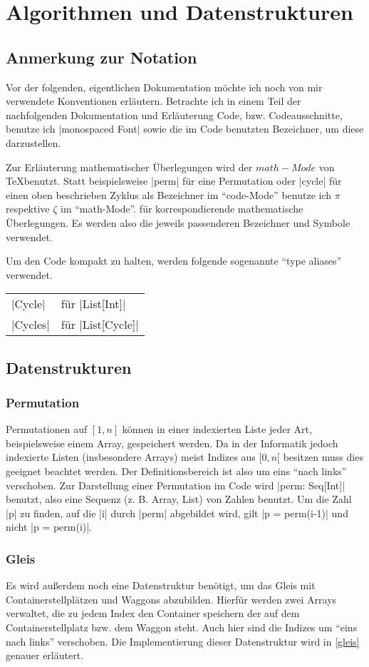 \section{Algorithmen und Datenstrukturen}
\subsection{Anmerkung zur Notation}
Vor der folgenden, eigentlichen Dokumentation möchte ich noch von mir verwendete Konventionen erläutern.
Betrachte ich in einem Teil der nachfolgenden Dokumentation und Erläuterung Code, bzw. Codeausschnitte,
benutze ich |monospaced Font| sowie die im Code benutzten Bezeichner, um diese darzustellen.

Zur Erläuterung mathematischer Überlegungen wird der $math-Mode$ von \TeX benutzt.
Statt beispielsweise |perm| für eine Permutation oder |cycle| für einen oben beschrieben Zyklus als Bezeichner im ``code-Mode'' benutze ich $\pi$ respektive $\zeta$ im ``math-Mode''.
für korrespondierende mathematische Überlegungen.
Es werden also die jeweils passenderen Bezeichner und Symbole verwendet.

Um den Code kompakt zu halten, werden folgende sogenannte ``type aliases'' verwendet.

\begin{tabular}{ll}
 |Cycle|  & für |List[Int]| \\
 |Cycles| & für |List[Cycle]| \\
\end{tabular}
\subsection{Datenstrukturen}
\subsubsection{Permutation}
Permutationen auf $[1,n]$ können in einer indexierten Liste jeder Art, beispielsweise einem Array, gespeichert werden.
Da in der Informatik jedoch indexierte Listen (insbesondere Arrays) meist Indizes aus $[0,n[$ besitzen muss dies geeignet beachtet werden.
Der Definitionsbereich ist also um eins ``nach links'' verschoben.
Zur Darstellung einer Permutation im Code wird |perm: Seq[Int]| benutzt, also eine Sequenz (z. B. Array, List) von Zahlen benutzt.
Um die Zahl |p| zu finden, auf die |i| durch |perm| abgebildet wird, gilt |p = perm(i-1)| und nicht |p = perm(i)|.
\subsubsection{Gleis}
Es wird außerdem noch eine Datenstruktur benötigt, um das Gleis mit Containerstellplätzen und Waggons abzubilden.
Hierfür werden zwei Arrays verwaltet, die zu jedem Index den Container speichern der auf dem Containerstellplatz bzw. dem Waggon steht.
Auch hier sind die Indizes um ``eins nach links'' verschoben.
Die Implementierung dieser Datenstruktur wird in \ref{gleis} genauer erläutert.
